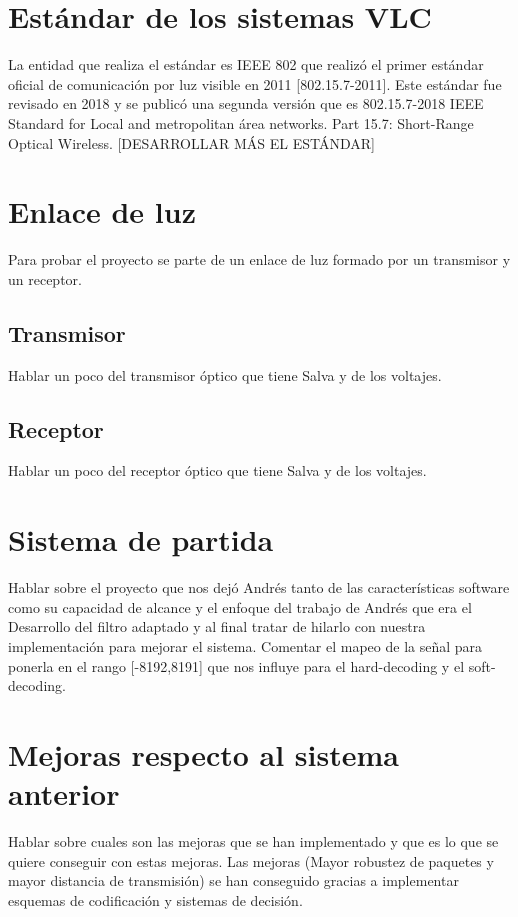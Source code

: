 
\label{chp:Utiliz}
\minitoc

\section{Estándar de los sistemas VLC}
La entidad que realiza el estándar es IEEE 802 que realizó el primer estándar oficial de
comunicación por luz visible en 2011 [802.15.7-2011]. Este estándar fue revisado en
2018 y se publicó una segunda versión que es 802.15.7-2018 IEEE Standard for Local
and metropolitan área networks. Part 15.7: Short-Range Optical Wireless.
[DESARROLLAR MÁS EL ESTÁNDAR]

\section{Enlace de luz}
Para probar el proyecto se parte de un enlace de luz formado por un transmisor y un receptor.

\subsection{Transmisor}
Hablar un poco del transmisor óptico que tiene Salva y de los voltajes.

\subsection{Receptor}
Hablar un poco del receptor óptico que tiene Salva y de los voltajes.

\section{Sistema de partida}
Hablar sobre el proyecto que nos dejó Andrés tanto de las características
software como su capacidad de alcance y el enfoque del trabajo de Andrés que era el Desarrollo
del filtro adaptado y al final tratar de hilarlo con nuestra implementación para mejorar el sistema.
Comentar el mapeo de la señal para ponerla en el rango [-8192,8191] que nos influye para el hard-decoding y el soft-decoding.

\section{Mejoras respecto al sistema anterior}
Hablar sobre cuales son las mejoras que se han implementado y que es lo que se quiere conseguir con estas mejoras.
Las mejoras (Mayor robustez de paquetes y mayor distancia de transmisión) se han conseguido
gracias a implementar esquemas de codificación y sistemas de decisión.

\chapterend{}
